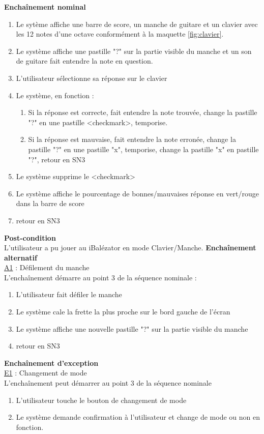 \documentclass{scrreprt}
\begin{document}
\textbf{Enchaînement nominal}\\
\begin{enumerate}
\item Le sytème affiche une barre de score, un manche de guitare et un clavier avec les 12 notes d'une octave conformément à la maquette \ref{fig:clavier}.
\item Le système affiche une pastille "?" sur la partie visible du manche et un son de guitare fait entendre la note en question.
\item L'utilisateur sélectionne sa réponse sur le clavier
\item Le système, en fonction : 
	\begin{enumerate}
	\item Si la réponse est correcte, fait entendre la note trouvée, change la pastille "?" en une pastille <checkmark>, temporise. 
	\item Si la réponse est mauvaise, fait entendre la note erronée, change la pastille "?" en une pastille "x", temporise, change la pastille "x" en pastille "?", retour en SN3
	\end{enumerate}
\item Le système supprime le <checkmark>
\item Le système affiche le pourcentage de bonnes/mauvaises réponse en vert/rouge dans la barre de score
\item retour en SN3
\end{enumerate}
\bigbreak

\textbf{Post-condition}\\
L'utilisateur a pu jouer au iBalézator en mode Clavier/Manche.
\bigbreak
\textbf{Enchaînement alternatif}\\
\underline{A1} : Défilement du manche\\
L'enchaînement démarre au point 3 de la séquence nominale :\\
\begin{enumerate}
\item L'utilisateur fait défiler le manche
\item Le système cale la frette la plus proche sur le bord gauche de l'écran
\item Le système affiche une nouvelle pastille "?" sur la partie visible du manche
\item retour en SN3
\end{enumerate}

\textbf{Enchaînement d'exception}\\
\underline{E1} : Changement de mode\\
L'enchaînement peut démarrer au point 3 de la séquence nominale\\
\begin{enumerate}
\item L'utilisateur touche le bouton de changement de mode
\item Le système demande confirmation à l'utilisateur et change de mode ou non en fonction.
\end{enumerate}
\end{document}
